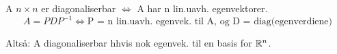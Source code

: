 A $n\times n$ er diagonaliserbar $\iff$ A har n lin.uavh. egenvektorer.
$$A=PDP^{-1} \iff
\text{P = n lin.uavh. egenvek. til A,
      og D = diag(egenverdiene)}$$

Altså: A diagonaliserbar hhvis nok egenvek. til en basis for $\mathbb{R}^n$.
